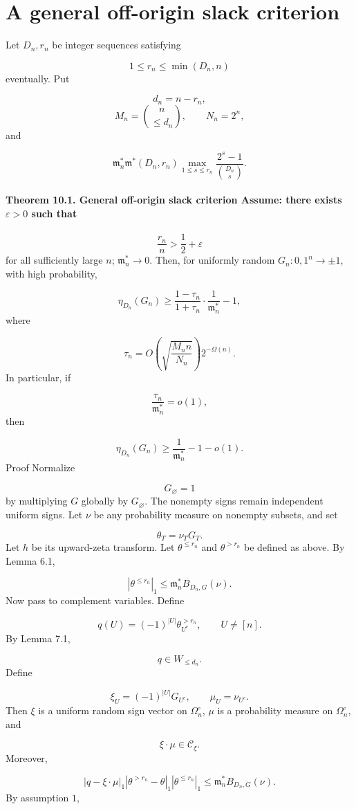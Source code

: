 \documentclass[11pt]{article}
\theoremstyle{definition}
\begin{document}
\section{A general off-origin slack criterion}
Let $D_n,r_n$ be integer sequences satisfying

\[
1\le r_n\le \min(D_n,n)
\]
eventually. Put

\[
d_n=n-r_n,
\]
\[
M_n=\binom{n}{\le d_n},
\qquad
N_n=2^n,
\]
and

\[
\mathfrak m_n^*
\mathfrak m^*(D_n,r_n)
\max_{1\le s\le r_n}
\frac{2^s-1}{\binom{D_n}{s}}.
\]
\paragraph{Theorem 10.1. General off-origin slack criterion Assume: there exists $\varepsilon>0$ such that}
\[
\frac{r_n}{n}>\frac12+\varepsilon
\]
for all sufficiently large $n$; $\mathfrak m_n^*\to0$. Then, for uniformly random $G_n:{0,1}^n\to{\pm1}$, with high probability,

\[
\eta_{D_n}(G_n)
\ge
\frac{1-\tau_n}{1+\tau_n}\cdot\frac1{\mathfrak m_n^*}-1,
\]
where

\[
\tau_n=
O\left(\sqrt{\frac{M_nn}{N_n}}\right)
2^{-\Omega(n)}.
\]
In particular, if

\[
\frac{\tau_n}{\mathfrak m_n^*}=o(1),
\]
then

\[
\eta_{D_n}(G_n)
\ge
\frac1{\mathfrak m_n^*}-1-o(1).
\]
Proof Normalize

\[
G_\varnothing=1
\]
by multiplying $G$ globally by $G_\varnothing$. The nonempty signs remain independent uniform signs. Let $\nu$ be any probability measure on nonempty subsets, and set

\[
\theta_T=\nu_TG_T.
\]
Let $h$ be its upward-zeta transform. Let $\theta^{\le r_n}$ and $\theta^{>r_n}$ be defined as above. By Lemma 6.1,

\[
|\theta^{\le r_n}|_1
\le
\mathfrak m_n^*B_{D_n,G}(\nu).
\]
Now pass to complement variables. Define

\[
q(U)=(-1)^{|U|}\theta^{>r_n}_{U^c},
\qquad
U\ne[n].
\]
By Lemma 7.1,

\[
q\in W_{\le d_n}.
\]
Define

\[
\xi_U=(-1)^{|U|}G_{U^c},
\qquad
\mu_U=\nu_{U^c}.
\]
Then $\xi$ is a uniform random sign vector on $\Omega_n^\circ$, $\mu$ is a probability measure on $\Omega_n^\circ$, and

\[
\xi\cdot\mu\in \mathcal C_\xi.
\]
Moreover,

\[
|q-\xi\cdot\mu|_1
|\theta^{>r_n}-\theta|_1
|\theta^{\le r_n}|_1
\le
\mathfrak m_n^*B_{D_n,G}(\nu).
\]
By assumption $1$,
\end{document}
